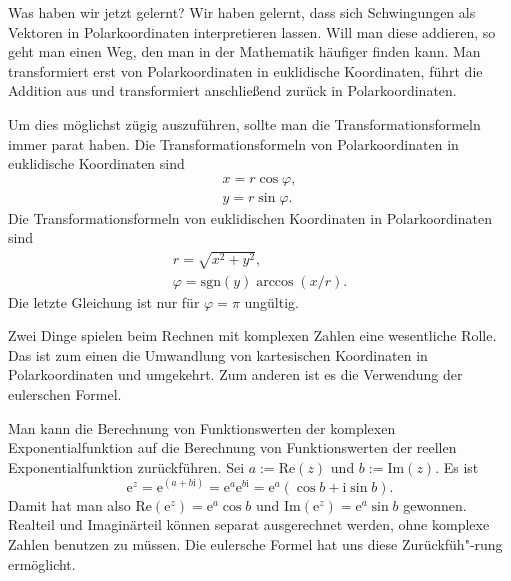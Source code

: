 \documentclass[a4paper,11pt,fleqn,twocolumn,twoside]{scrartcl}
\numberwithin{equation}{section}
\newcommand{\ui}{\mathrm i}
\newcommand{\ee}{\mathrm e}
\begin{document}
Was haben wir jetzt gelernt? Wir haben gelernt, dass sich Schwingungen
als Vektoren in Polarkoordinaten interpretieren lassen. Will man diese
addieren, so geht man einen Weg, den man in der Mathematik häufiger
finden kann. Man transformiert erst von Polarkoordinaten in
euklidische Koordinaten, führt die Addition aus und transformiert
anschließend zurück in Polarkoordinaten.

Um dies möglichst zügig auszuführen, sollte man die
Transformationsformeln immer parat haben. Die Transformationsformeln
von Polarkoordinaten in euklidische Koordinaten sind%
\begin{gather}
x = r\cos\varphi,\\
y = r\sin\varphi.
\end{gather}
\noindent
Die Transformationsformeln von euklidischen Koordinaten in
Polarkoordinaten sind%
\begin{gather}
r = \sqrt{x^2+y^2},\\
\varphi = \mathrm{sgn}(y)\arccos(x/r).
\end{gather}
Die letzte Gleichung ist nur für $\varphi=\pi$ ungültig.

Zwei Dinge spielen beim Rechnen mit komplexen Zahlen eine
wesentliche Rolle. Das ist zum einen die Umwandlung von kartesischen
Koordinaten in Polarkoordinaten und umgekehrt. Zum anderen ist es
die Verwendung der eulerschen Formel.

Man kann die Berechnung von Funktionswerten der komplexen
Exponentialfunktion auf die Berechnung von Funktionswerten
der reellen Exponentialfunktion zurückführen.
Sei $a:=\mathrm{Re}(z)$ und $b:=\mathrm{Im}(z)$. Es ist%
\begin{equation}
\ee^z = \ee^{(a+b\ui)} = \ee^a \ee^{b\ui} = \ee^a(\cos b+\ui\sin b).
\end{equation}
Damit hat man also $\mathrm{Re}(\ee^z) = \ee^a\cos b$ und
$\mathrm{Im}(\ee^z) = \ee^a\sin b$ gewonnen. Realteil und Imaginärteil
können separat ausgerechnet werden, ohne komplexe Zahlen benutzen
zu müssen. Die eulersche Formel hat uns diese Zurückfüh"-rung
ermöglicht.
\end{document}
